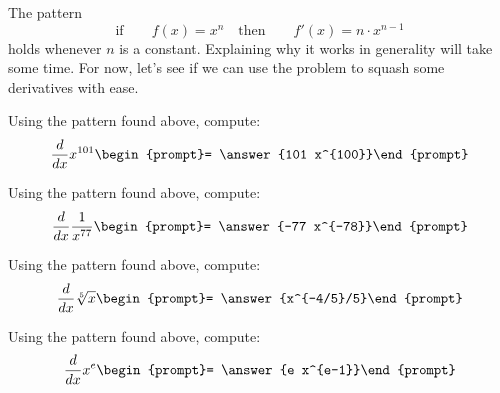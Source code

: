 \documentclass{ximera}
\begin{document}
The pattern
\[
  \text{if} \qquad f(x) = x^n\quad\text{then}\qquad f'(x) = n\cdot x^{n-1}
\]
holds whenever $n$ is a constant. Explaining why it works in
generality will take some time. For now, let's see if we can use the
problem to squash some derivatives with ease.

\begin{problem}
  Using the pattern found above, compute:
  \[
  \ddx x^{101} \begin{prompt}= \answer{101 x^{100}}\end{prompt}
  \]
\end{problem}

\begin{problem}
  Using the pattern found above, compute:
  \[
  \ddx \frac{1}{x^{77}} \begin{prompt}= \answer{-77 x^{-78}}\end{prompt}
  \]
\end{problem}


\begin{problem}
  Using the pattern found above, compute:
  \[
  \ddx \sqrt[5]{x} \begin{prompt}= \answer{x^{-4/5}/5}\end{prompt}
  \]
\end{problem}

\begin{problem}
  Using the pattern found above, compute:
  \[
  \ddx x^e  \begin{prompt}= \answer{e x^{e-1}}\end{prompt}
  \]
\end{problem}

%
\end{document}
